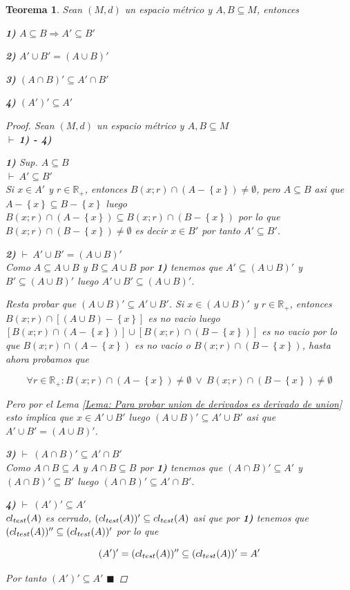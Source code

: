 \documentclass[oneside]{book} %
\theoremstyle{Teorema}
\newtheorem{Teorema}[Definicion]{Teorema}
\theoremstyle{Ejemplos}
\theoremstyle{[Obs]}
\def \test {test}
\newcommand{\cerradura}[2][\test]{\ifx \test #1 {\overline{#2}} \else {cl_{#1}(#2)} \fi} %
\renewcommand{\{}{\left\lbrace} %
\renewcommand{\}}{\right\rbrace} %
\renewcommand{\o}{\ \vee \ } %
\renewcommand{\u}{\cup} %
\newcommand{\n}{\cap} %
\renewcommand{\sc}{\subseteq} %
\newcommand{\R}{\mathbb{R}} %
\renewcommand{\qed}{$\blacksquare$} %
\newcommand{\pd}{$\vdash\ $} %
\begin{document}
			\begin{Teorema}\setlength{\parindent}{0em}
			
				Sean $(M, d)$ un espacio métrico y $A, B \sc M$, entonces 

				\textbf{1)} $A \sc B \Rightarrow A' \sc B'$

				\textbf{2)} $A' \u B' = (A \u B)'$

				\textbf{3)} $(A \n B)' \sc A' \n B'$

				\textbf{4)} $(A')' \sc A'$

				\begin{proof}
					
					Sean $(M, d)$ un espacio métrico y $A, B \sc M$ \\ 
					\pd \textbf{1) - 4)}

					\textbf{1)} Sup. $A \sc B$ \\ 
					\pd $A' \sc B'$ \\ 
					Si $x \in A'$ y $r \in \R_{+}$, entonces $B(x;r) \n (A - \{ x \}) \neq \emptyset$, pero $A \sc B$ asi que $A - \{ x \} \sc B - \{ x \}$ luego $B(x;r) \n (A - \{ x \}) \sc B(x;r) \n (B - \{ x \})$ por lo que $B(x;r) \n (B - \{ x \}) \neq \emptyset$ es decir $x \in B'$ por tanto $A' \sc B'$. 

					\textbf{2)} \pd $A' \u B' = (A \u B)'$ \\ 
					Como $A \sc A \u B$ y $B \sc A \u B$ por \textbf{1)} tenemos que $A' \sc (A \u B)'$ y $B' \sc (A \u B)'$ luego $A' \u B' \sc (A \u B)'$.

					Resta probar que $(A \u B)' \sc A' \u B'$. Si $x \in (A \u B)'$ y $r \in \R_{+}$, entonces $B(x;r) \n [(A \u B) - \{ x \}]$ es no vacio luego $[B(x;r) \n (A - \{ x \})] \u [B(x;r) \n (B - \{ x \})]$ es no vacio por lo que $B(x;r) \n (A - \{ x \})$ es no vacio o $B(x;r) \n (B - \{ x \})$, hasta ahora probamos que 
					
					\[ \forall r \in \R_{+} : B(x;r) \n (A - \{ x \}) \neq \emptyset \o B(x;r) \n (B - \{ x \}) \neq \emptyset \]
					
					Pero por el Lema \ref{Lema: Para probar union de derivados es derivado de union} esto implica que $x \in A' \u B'$ luego $(A \u B)' \sc A' \u B'$ asi que $A' \u B' = (A \u B)'$.
	
					\textbf{3)} \pd $(A \n B)' \sc A' \n B'$ \\ 
					Como $A \n B \sc A$ y $A \n B \sc B$ por \textbf{1)} tenemos que $(A \n B)' \sc A'$ y $(A \n B)' \sc B'$ luego $(A \n B)' \sc A' \n B'$.

					\textbf{4)} \pd $(A')' \sc A'$ \\ 
					$\cerradura{A}$ es cerrado, $(\cerradura{A})' \sc \cerradura{A}$ asi que por \textbf{1)} tenemos que $(\cerradura{A})'' \sc (\cerradura{A})'$ por lo que 

					\[ (A')' = (\cerradura{A})'' \sc (\cerradura{A})' = A' \]

					Por tanto $(A')' \sc A'$ \qed

				\end{proof}
			
			\end{Teorema}
\end{document}
